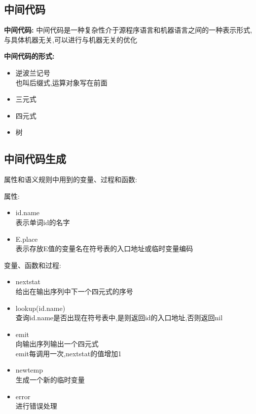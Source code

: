 \documentclass[UTF8,a4paper]{ctexart}
\begin{document}
 \subsection{中间代码}

 \textbf{中间代码:}
 中间代码是一种复杂性介于源程序语言和机器语言之间的一种表示形式,与具体机器无关,可以进行与机器无关的优化

 \textbf{中间代码的形式:}
 \begin{itemize}
  \item 逆波兰记号\\
        也叫后缀式,运算对象写在前面
  \item 三元式
  \item 四元式
  \item 树
 \end{itemize}

 \subsection{中间代码生成}
 属性和语义规则中用到的变量、过程和函数:

 属性:
 \begin{itemize}
  \item id.name\\
        表示单词id的名字
  \item E.place\\
        表示存放E值的变量名在符号表的入口地址或临时变量编码
 \end{itemize}

 变量、函数和过程:
 \begin{itemize}
  \item nextstat\\
        给出在输出序列中下一个四元式的序号
  \item lookup(id.name)\\
        查询id.name是否出现在符号表中,是则返回id的入口地址,否则返回nil
  \item emit\\
        向输出序列输出一个四元式\\
        emit每调用一次,nextstat的值增加1
  \item newtemp\\
        生成一个新的临时变量
  \item error\\
        进行错误处理
 \end{itemize}
\end{document}
